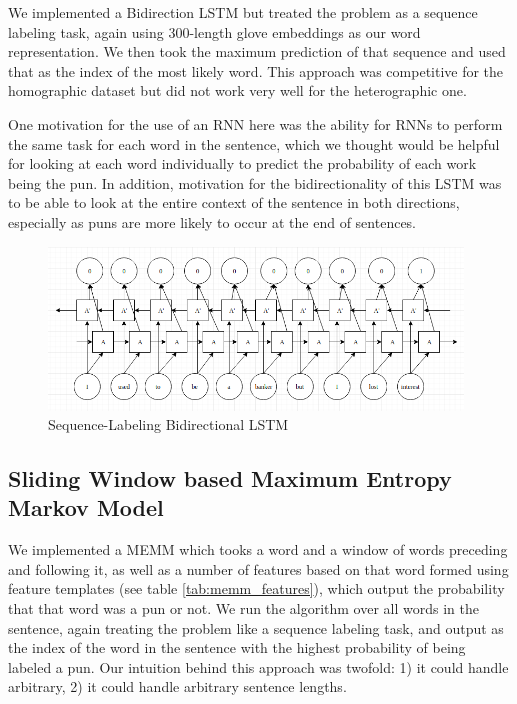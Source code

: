 \documentclass{article}
\begin{document}
We implemented a Bidirection LSTM but treated the problem as a sequence labeling
task, again using 300-length glove embeddings as our word representation. We
then took the maximum prediction of that sequence and used that as the index of
the most likely word. This approach was competitive for the homographic dataset
but did not work very well for the heterographic one. 

One motivation for the use of an RNN here was the ability for RNNs to perform the same task for each word in the sentence, which we thought would be helpful for looking at each word individually to predict the probability of each work being the pun. In addition, motivation for the bidirectionality of this LSTM was to be able to look at the entire context of the sentence in both directions, especially as puns are more likely to occur at the end of sentences. 

\begin{figure}[h!]
	\centering
	\includegraphics[width=110mm]{figures/lstm.png}
	\caption{Sequence-Labeling Bidirectional LSTM}
	\label{fig:LSTM}
\end{figure}

\subsection{Sliding Window based Maximum Entropy Markov Model}

We implemented a MEMM which tooks a word and a window of words preceding and
following it, as well as a number of features based on that word formed using
feature templates (see table \ref{tab:memm_features}), which output the probability
that that word was a pun or not. We run the algorithm over all words in the
sentence, again treating the problem like a sequence labeling task, and output
as the index of the word in the sentence with the highest probability of being
labeled a pun. Our intuition behind this approach was twofold: 1) it could
handle arbitrary, 2) it could handle arbitrary sentence lengths. 
\end{document}
